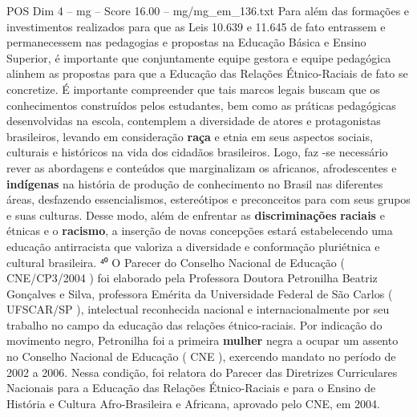 \begin{textsample}{POS Dim 4 – mg – Score 16.00 – mg/mg\_em\_136.txt}
Para além das formações e investimentos realizados para que as Leis 10.639 e 11.645 de fato entrassem e permanecessem nas pedagogias e propostas na Educação Básica e Ensino Superior, é importante que conjuntamente equipe gestora e equipe pedagógica alinhem as propostas para que a Educação das Relações Étnico-Raciais de fato se concretize.
É importante compreender que tais marcos legais buscam que os conhecimentos construídos pelos estudantes, bem como as práticas pedagógicas desenvolvidas na escola, contemplem a diversidade de atores e protagonistas brasileiros, levando em consideração \textbf{raça} e etnia em seus aspectos sociais, culturais e históricos na vida dos cidadãos brasileiros.
Logo, faz -se necessário rever as abordagens e conteúdos que marginalizam os africanos, afrodescentes e \textbf{indígenas} na história de produção de conhecimento no Brasil nas diferentes áreas, desfazendo essencialismos, estereótipos e preconceitos para com seus grupos e suas culturas.
Desse modo, além de enfrentar as \textbf{discriminações} \textbf{raciais} e étnicas e o \textbf{racismo}, a inserção de novas concepções estará estabelecendo uma educação antirracista que valoriza a diversidade e conformação pluriétnica e cultural brasileira. ⁴⁰ O Parecer do Conselho Nacional de Educação ( CNE/CP3/2004 ) foi elaborado pela Professora Doutora Petronilha Beatriz Gonçalves e Silva, professora Emérita da Universidade Federal de São Carlos ( UFSCAR/SP ), intelectual reconhecida nacional e internacionalmente por seu trabalho no campo da educação das relações étnico-raciais.
Por indicação do movimento negro, Petronilha foi a primeira \textbf{mulher} negra a ocupar um assento no Conselho Nacional de Educação ( CNE ), exercendo mandato no período de 2002 a 2006.
Nessa condição, foi relatora do Parecer das Diretrizes Curriculares Nacionais para a Educação das Relações Étnico-Raciais e para o Ensino de História e Cultura Afro-Brasileira e Africana, aprovado pelo CNE, em 2004.

\end{textsample}
